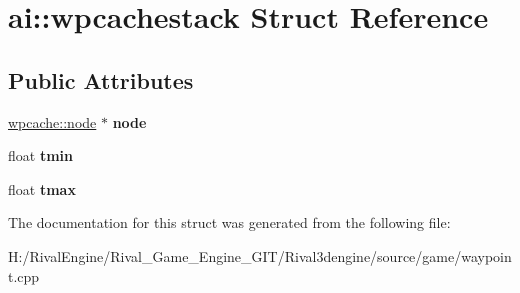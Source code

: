 \hypertarget{structai_1_1wpcachestack}{}\section{ai\+:\+:wpcachestack Struct Reference}
\label{structai_1_1wpcachestack}
\subsection*{Public Attributes}
\begin{DoxyCompactItemize}
\item 
\mbox{\label{structai_1_1wpcachestack_aadc261d917cc29b971b3ab6e888b8467}} 
\hyperlink{structai_1_1wpcache_1_1node}{wpcache\+::node} $\ast$ {\bfseries node}
\item 
\mbox{\label{structai_1_1wpcachestack_a7ed1f218bf9efb69dcaa92ee7a696c9c}} 
float {\bfseries tmin}
\item 
\mbox{\label{structai_1_1wpcachestack_a36445c6b8640a884e16699c9b33a8e64}} 
float {\bfseries tmax}
\end{DoxyCompactItemize}


The documentation for this struct was generated from the following file\+:\begin{DoxyCompactItemize}
\item 
H\+:/\+Rival\+Engine/\+Rival\+\_\+\+Game\+\_\+\+Engine\+\_\+\+G\+I\+T/\+Rival3dengine/source/game/waypoint.\+cpp\end{DoxyCompactItemize}
